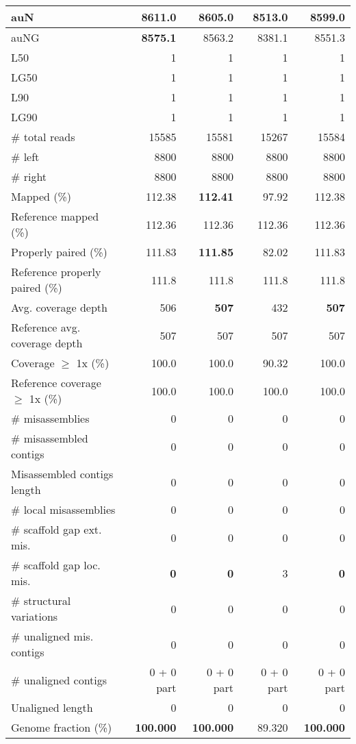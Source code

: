 \documentclass[12pt,a4paper]{article}
\begin{document}
\begin{table}[ht]
\begin{center}
\begin{tabular}{|l*{4}{|r}|}
auN & {\bf 8611.0} & 8605.0 & 8513.0 & 8599.0 \\ \hline
auNG & {\bf 8575.1} & 8563.2 & 8381.1 & 8551.3 \\ \hline
L50 & 1 & 1 & 1 & 1 \\ \hline
LG50 & 1 & 1 & 1 & 1 \\ \hline
L90 & 1 & 1 & 1 & 1 \\ \hline
LG90 & 1 & 1 & 1 & 1 \\ \hline
\# total reads & 15585 & 15581 & 15267 & 15584 \\ \hline
\# left & 8800 & 8800 & 8800 & 8800 \\ \hline
\# right & 8800 & 8800 & 8800 & 8800 \\ \hline
Mapped (\%) & 112.38 & {\bf 112.41} & 97.92 & 112.38 \\ \hline
Reference mapped (\%) & 112.36 & 112.36 & 112.36 & 112.36 \\ \hline
Properly paired (\%) & 111.83 & {\bf 111.85} & 82.02 & 111.83 \\ \hline
Reference properly paired (\%) & 111.8 & 111.8 & 111.8 & 111.8 \\ \hline
Avg. coverage depth & 506 & {\bf 507} & 432 & {\bf 507} \\ \hline
Reference avg. coverage depth & 507 & 507 & 507 & 507 \\ \hline
Coverage $\geq$ 1x (\%) & 100.0 & 100.0 & 90.32 & 100.0 \\ \hline
Reference coverage $\geq$ 1x (\%) & 100.0 & 100.0 & 100.0 & 100.0 \\ \hline
\# misassemblies & 0 & 0 & 0 & 0 \\ \hline
\# misassembled contigs & 0 & 0 & 0 & 0 \\ \hline
Misassembled contigs length & 0 & 0 & 0 & 0 \\ \hline
\# local misassemblies & 0 & 0 & 0 & 0 \\ \hline
\# scaffold gap ext. mis. & 0 & 0 & 0 & 0 \\ \hline
\# scaffold gap loc. mis. & {\bf 0} & {\bf 0} & 3 & {\bf 0} \\ \hline
\# structural variations & 0 & 0 & 0 & 0 \\ \hline
\# unaligned mis. contigs & 0 & 0 & 0 & 0 \\ \hline
\# unaligned contigs & 0 + 0 part & 0 + 0 part & 0 + 0 part & 0 + 0 part \\ \hline
Unaligned length & 0 & 0 & 0 & 0 \\ \hline
Genome fraction (\%) & {\bf 100.000} & {\bf 100.000} & 89.320 & {\bf 100.000} \\ \hline

\end{tabular}
\end{center}
\end{table}
\end{document}
